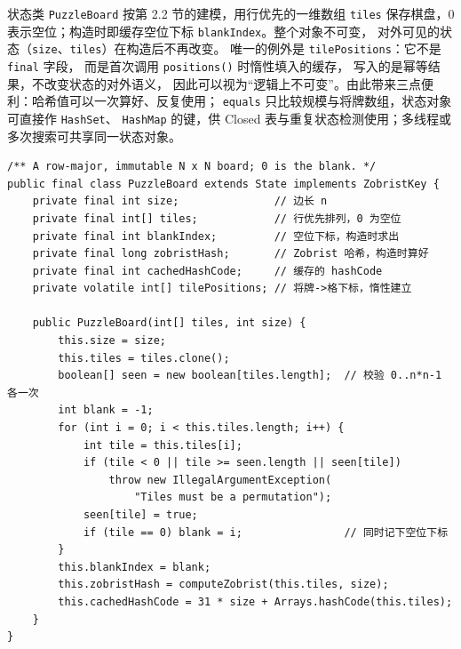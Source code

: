 \FloatBarrier
{}
\par\vspace{2bp}

状态类 \texttt{PuzzleBoard} 按第 2.2 节的建模，用行优先的一维数组 \texttt{tiles}
保存棋盘，0 表示空位；构造时即缓存空位下标 \texttt{blankIndex}。整个对象不可变，
对外可见的状态（\texttt{size}、\texttt{tiles}）在构造后不再改变。
唯一的例外是 \texttt{tilePositions}：它不是 \texttt{final} 字段，
而是首次调用 \texttt{positions()} 时惰性填入的缓存，
写入的是幂等结果，不改变状态的对外语义，
因此可以视为“逻辑上不可变”。由此带来三点便利：哈希值可以一次算好、反复使用；
\texttt{equals} 只比较规模与将牌数组，状态对象可直接作 \texttt{HashSet}、
\texttt{HashMap} 的键，供 Closed 表与重复状态检测使用；多线程或多次搜索可共享同一状态对象。

\par\noindent\begin{minipage}{\linewidth}
\par\vspace{2bp}
{\fontsize{9.5bp}{12bp}\selectfont
\noindent\begin{minipage}{\linewidth}
\begin{verbatim}
/** A row-major, immutable N x N board; 0 is the blank. */
public final class PuzzleBoard extends State implements ZobristKey {
    private final int size;               // 边长 n
    private final int[] tiles;            // 行优先排列，0 为空位
    private final int blankIndex;         // 空位下标，构造时求出
    private final long zobristHash;       // Zobrist 哈希，构造时算好
    private final int cachedHashCode;     // 缓存的 hashCode
    private volatile int[] tilePositions; // 将牌->格下标，惰性建立

    public PuzzleBoard(int[] tiles, int size) {
        this.size = size;
        this.tiles = tiles.clone();
        boolean[] seen = new boolean[tiles.length];  // 校验 0..n*n-1 各一次
        int blank = -1;
        for (int i = 0; i < this.tiles.length; i++) {
            int tile = this.tiles[i];
            if (tile < 0 || tile >= seen.length || seen[tile])
                throw new IllegalArgumentException(
                    "Tiles must be a permutation");
            seen[tile] = true;
            if (tile == 0) blank = i;                // 同时记下空位下标
        }
        this.blankIndex = blank;
        this.zobristHash = computeZobrist(this.tiles, size);
        this.cachedHashCode = 31 * size + Arrays.hashCode(this.tiles);
    }
}
\end{verbatim}
\end{minipage}}
\end{minipage}\par

